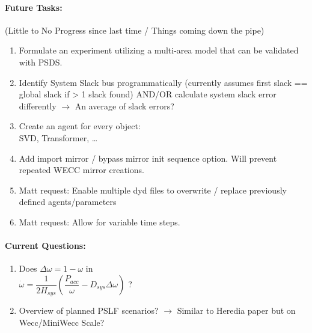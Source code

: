 \documentclass[12pt]{article}
\begin{document}
\begin{multicols}{2}
\begin{enumerate}
		

		
		

	\end{enumerate}
\vfill\null
\columnbreak

\paragraph{Future Tasks:}(Little to No Progress since last time / Things coming down the pipe)
	\begin{enumerate}
		\item Formulate an experiment utilizing a multi-area model that can be validated with PSDS.
		\item Identify System Slack bus programmatically (currently assumes first slack == global slack if > 1 slack found)
		\subitem AND/OR calculate system slack error differently $\rightarrow$ An average of slack errors?

		\item Create an agent for every object: \\ SVD, Transformer, \ldots
		\item Add import mirror / bypass mirror init sequence option. Will prevent repeated WECC mirror creations.
		\item Matt request: Enable multiple dyd files to overwrite / replace previously defined agents/parameters
		\item Matt request: Allow for variable time steps.
		
	\end{enumerate}
	\paragraph{Current Questions:}
	\begin{enumerate}
	\item Does $\Delta \omega=1-\omega$ in \\ $\dot{\omega}=\dfrac{1}{2H_{sys}}\left(\dfrac{P_{acc}}{\omega} - D_{sys}\Delta \omega \right)$ ?
		\item Overview of planned PSLF scenarios? $\rightarrow$ Similar to Heredia paper but on Wecc/MiniWecc Scale? 
		

\end{enumerate}
\end{multicols}
\end{document}
